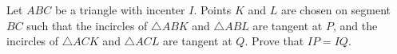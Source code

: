 Let $ABC$ be a triangle with incenter $I$. Points $K$ and $L$ are chosen on segment $BC$ such that the incircles of $\triangle ABK$ and $\triangle ABL$ are tangent at $P$, and the incircles of $\triangle ACK$ and $\triangle ACL$ are tangent at $Q$. Prove that $IP=IQ$.